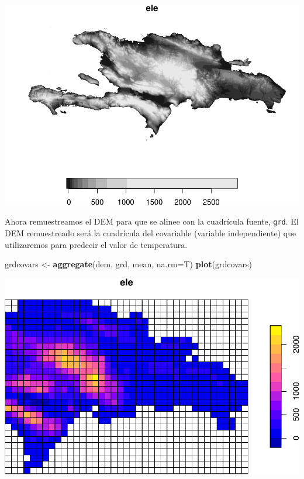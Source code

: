 \documentclass[11pt,]{article}
\newenvironment{Shaded}{\begin{snugshade}}{\end{snugshade}}
\newcommand{\KeywordTok}[1]{\textcolor[rgb]{0.13,0.29,0.53}{\textbf{#1}}}
\newcommand{\DataTypeTok}[1]{\textcolor[rgb]{0.13,0.29,0.53}{#1}}
\newcommand{\StringTok}[1]{\textcolor[rgb]{0.31,0.60,0.02}{#1}}
\newcommand{\NormalTok}[1]{#1}
\begin{document}
\includegraphics[width=800px]{Proyecto-Precipitaciones_files/figure-latex/dem-1}

Ahora remuestreamos el DEM para que se alinee con la cuadrícula fuente,
\texttt{grd}. El DEM remuestreado será la cuadrícula del covariable
(variable independiente) que utilizaremos para predecir el valor de
temperatura.

\begin{Shaded}
\begin{Highlighting}[]
\NormalTok{grdcovars <-}\StringTok{ }\KeywordTok{aggregate}\NormalTok{(dem, grd, mean, }\DataTypeTok{na.rm=}\NormalTok{T)}
\KeywordTok{plot}\NormalTok{(grdcovars)}
\end{Highlighting}
\end{Shaded}

\includegraphics[width=800px]{Proyecto-Precipitaciones_files/figure-latex/remuestrear-dem-1}
\end{document}
